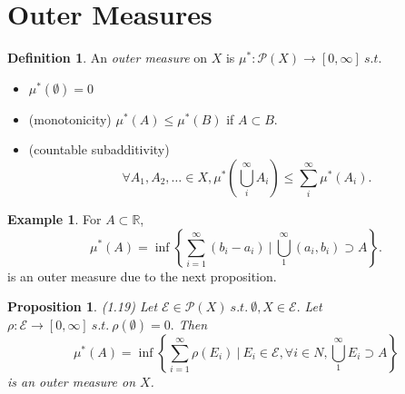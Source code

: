 \documentclass{report}
\newcommand{\R}{\mathbb{R}}
\newcommand{\st}{\ s.t.\ }
\newtheorem{proposition}[theorem]{Proposition}
\theoremstyle{definition}
\newtheorem{definition}[theorem]{Definition}
\newtheorem{example}[theorem]{Example}
\theoremstyle{remark}
\begin{document}
\section{Outer Measures}
\begin{definition}
An \emph{outer measure} on $X$ is $\mu^*: \mathcal{P}(X) \to [0, \infty] \st$
\begin{itemize}
\item
	$\mu^*(\emptyset) = 0$
\item(monotonicity)
	$\mu^*(A) \leq \mu^*(B)$ if $A \subset B.$
\item(countable subadditivity)
	\[\forall A_1, A_2, \ldots \in X, \mu^*\left(\bigcup_i^\infty A_i\right) \leq \sum_i^\infty \mu^*(A_i).\]
\end{itemize}
\end{definition}
\begin{example}
	For $A \subset \R$,
	\[\mu^*(A) = \inf\left\{\sum_{i=1}^\infty(b_i - a_i) \ \biggr\rvert\ \bigcup_1^\infty (a_i, b_i) \supset A\right\}.\]
	is an outer measure due to the next proposition.
\end{example}
\begin{proposition}\label{prop:induce}(1.19)
Let $\mathcal{E} \in \mathcal{P}(X) \st \emptyset, X \in \mathcal{E}.$
Let $\rho: \mathcal{E} \to [0, \infty] \st \rho(\emptyset) = 0.$
Then
\[
\mu^*(A) = \inf\left\{\sum_{i=1}^\infty \rho(E_i) \ \biggr\rvert\ E_i \in \mathcal{E}, \forall i \in N, \bigcup_1^\infty E_i \supset A\right\}\]
is an outer measure on $X$.
\end{proposition}
\end{document}
